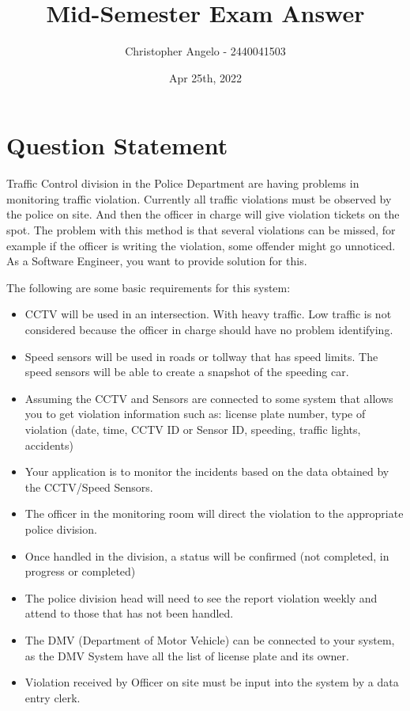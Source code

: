 \documentclass[
  11pt, %
]{assignment}
\author{Christopher Angelo - 2440041503}
\institute{BINUS University\\ Global Class}
\date{Apr 25th, 2022}
\title{Mid-Semester Exam Answer}
\begin{document}
\maketitle


\section*{Question Statement}
\begin{problem}
Traffic Control division in the Police Department are having problems in monitoring traffic violation. Currently all traffic violations must be observed by the police on site. And then the officer in charge will give violation tickets on the spot. The problem with this method is that several violations can be missed, for example if the officer is writing the violation, some offender might go unnoticed. As a Software Engineer, you want to provide solution for this.

\medskip

The following are some basic requirements for this system:
\begin{itemize}
  \item CCTV will be used in an intersection. With heavy traffic. Low traffic is not considered because the officer in charge should have no problem identifying.
  \item Speed sensors will be used in roads or tollway that has speed limits. The speed sensors will be able to create a snapshot of the speeding car.
  \item Assuming the CCTV and Sensors are connected to some system that allows you to get violation information such as: license plate number, type of violation (date, time, CCTV ID or Sensor ID, speeding, traffic lights, accidents)
  \item Your application is to monitor the incidents based on the data obtained by the CCTV/Speed Sensors.
  \item The officer in the monitoring room will direct the violation to the appropriate police division.
  \item Once handled in the division, a status will be confirmed (not completed, in progress or completed)
  \item The police division head will need to see the report violation weekly and attend to those that has not been handled.
  \item The DMV (Department of Motor Vehicle) can be connected to your system, as the DMV System have all the list of license plate and its owner.
  \item Violation received by Officer on site must be input into the system by a data entry clerk.
\end{itemize}
\end{problem}
\end{document}
